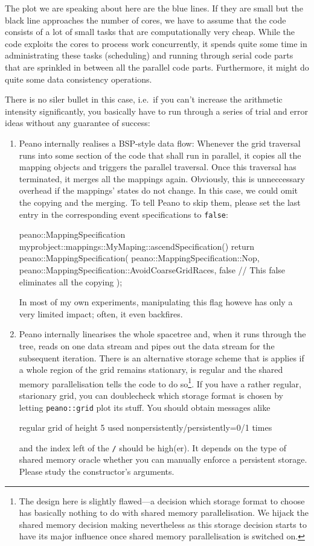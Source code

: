 \noindent
The plot we are speaking about here are the blue lines. If they are small but
the black line approaches the number of cores, we have to assume that the code
consists of a lot of small tasks that are computationally very cheap.
While the code exploits the cores to process work concurrently, it spends quite
some time in administrating these tasks (scheduling) and running through serial
code parts that are sprinkled in between all the parallel code parts.
Furthermore, it might do quite some data consistency operations.


There is no siler bullet in this case, i.e.~if you can't increase the arithmetic
intensity significantly, you basically have to run through a series of trial and
error ideas without any guarantee of success:

\begin{enumerate}
  \item Peano internally realises a BSP-style data flow: Whenever the grid
  traversal runs into some section of the code that shall run in parallel, it
  copies all the mapping objects and triggers the parallel traversal. Once this
  traversal has terminated, it merges all the mappings again. Obviously, this is
  unneccessary overhead if the mappings' states do not change. In this case, we
  could omit the copying and the merging. To tell Peano to skip them, please set
  the last entry in the corresponding event specifications to \texttt{false}:
  \begin{code}
peano::MappingSpecification  
myprobject::mappings::MyMaping::ascendSpecification() { 
 return peano::MappingSpecification(
  peano::MappingSpecification::Nop,
  peano::MappingSpecification::AvoidCoarseGridRaces,
  false // This false eliminates all the copying 
 );
}
  \end{code}
  In most of my own experiments, manipulating this flag howeve has only a very
  limited impact; often, it even backfires.
  \item Peano internally linearises the whole spacetree and, when it runs
  through the tree, reads on one data stream and pipes out the data stream for
  the subsequent iteration. There is an alternative storage scheme that is
  applies if a whole region of the grid remains stationary, is regular and the
  shared memory parallelisation tells the code to do so\footnote{The  design
  here is slightly flawed---a decision which storage format to choose has
  basically nothing to do with shared memory parallelisation. We hijack the
  shared memory decision making nevertheless as this storage decision starts to
  have its major influence once shared memory parallelisation is switched on.}.
  If you have a rather regular, starionary grid, you can doublecheck which
  storage format is chosen by letting \texttt{peano::grid} plot its stuff. You
  should obtain messages alike
  \begin{code}
  regular grid of height 5 used nonpersistently/persistently=0/1 times
  \end{code}
  and the index left of the \texttt{/} should be high(er). It depends on the
  type of shared memory oracle whether you can manually enforce a persistent
  storage. Please study the constructor's arguments.
\end{enumerate}



